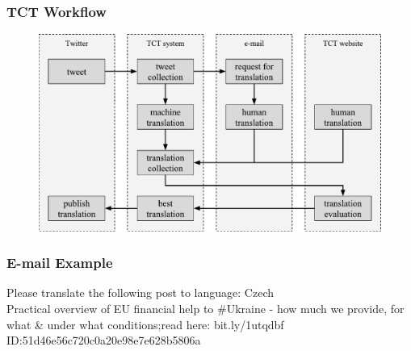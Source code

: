 \documentclass[12pt]{beamer}
\begin{document}
\begin{frame}
	\frametitle{TCT Workflow}
	\begin{center}
		\begin{figure}
			\includegraphics[width=\textwidth]{diagram}
		\end{figure}
	\end{center}
\end{frame}

\begin{frame}
	\frametitle{E-mail Example}
	Please translate the following post to language: Czech
	\\[1cm]
	Practical overview of EU financial help to \#Ukraine - how much we provide, for what \& under what conditions;read here: bit.ly/1utqdbf
	\\[1cm]
	ID:51d46e56c720c0a20e98e7e628b5806a
\end{frame}
\end{document}
